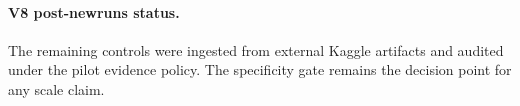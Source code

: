 \paragraph{V8 post-newruns status.}
The remaining controls were ingested from external Kaggle artifacts and audited under the pilot evidence policy. The specificity gate remains the decision point for any scale claim.
